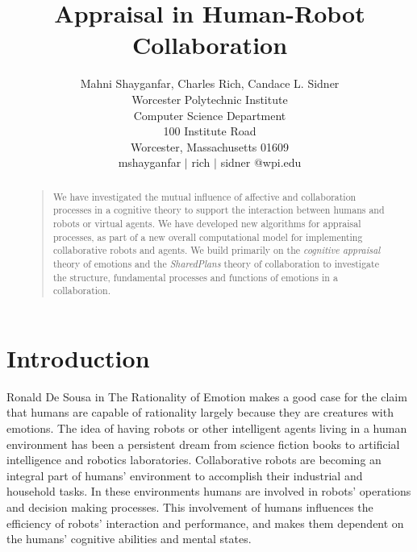 \documentclass[letterpaper]{article}
\begin{document}
%
\title{Appraisal in Human-Robot Collaboration}
\author{Mahni Shayganfar, Charles Rich, Candace L. Sidner\\
Worcester Polytechnic Institute\\
Computer Science Department\\
100 Institute Road\\
Worcester, Massachusetts 01609\\
mshayganfar $|$ rich $|$ sidner @wpi.edu
}
\maketitle
\begin{abstract}
\vspace*{-2mm}
\begin{quote}
We have investigated the mutual influence of affective and collaboration
processes in a cognitive theory to support the interaction between humans and
robots or virtual agents. We have developed new algorithms for appraisal
processes, as part of a new overall computational model for implementing
collaborative robots and agents. We build primarily on the \textit{cognitive
appraisal} theory of emotions \cite{gratch:domain-independent} and the
\textit{SharedPlans} theory \cite{grosz:plans-discourse} of collaboration to
investigate the structure, fundamental processes and functions of emotions in a
collaboration.
\end{quote}
\end{abstract}

\vspace*{-6mm}
\section{Introduction}

Ronald De Sousa in The Rationality of Emotion \cite{sousa:rationality-emotion}
makes a good case for the claim that humans are capable of rationality largely
because they are creatures with emotions. The idea of having robots or other
intelligent agents living in a human environment has been a persistent dream
from science fiction books to artificial intelligence and robotics laboratories.
Collaborative robots are becoming an integral part of humans' environment to
accomplish their industrial and household tasks. In these environments humans
are involved in robots' operations and decision making processes. This
involvement of humans influences the efficiency of robots' interaction and
performance, and makes them dependent on the humans' cognitive abilities and
mental states.
\end{document}
